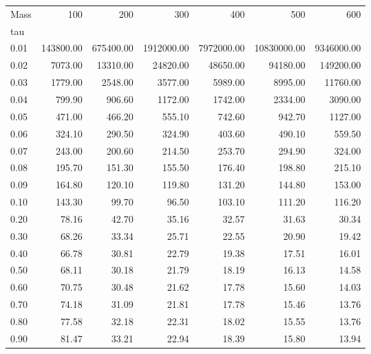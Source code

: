 \begin{tabular}{lrrrrrr}
\toprule
Mass &        100 &        200 &         300 &         400 &          500 &         600 \\
tau   &            &            &             &             &              &             \\
\midrule
0.01  &  143800.00 &  675400.00 &  1912000.00 &  7972000.00 &  10830000.00 &  9346000.00 \\
0.02  &    7073.00 &   13310.00 &    24820.00 &    48650.00 &     94180.00 &   149200.00 \\
0.03  &    1779.00 &    2548.00 &     3577.00 &     5989.00 &      8995.00 &    11760.00 \\
0.04  &     799.90 &     906.60 &     1172.00 &     1742.00 &      2334.00 &     3090.00 \\
0.05  &     471.00 &     466.20 &      555.10 &      742.60 &       942.70 &     1127.00 \\
0.06  &     324.10 &     290.50 &      324.90 &      403.60 &       490.10 &      559.50 \\
0.07  &     243.00 &     200.60 &      214.50 &      253.70 &       294.90 &      324.00 \\
0.08  &     195.70 &     151.30 &      155.50 &      176.40 &       198.80 &      215.10 \\
0.09  &     164.80 &     120.10 &      119.80 &      131.20 &       144.80 &      153.00 \\
0.10  &     143.30 &      99.70 &       96.50 &      103.10 &       111.20 &      116.20 \\
0.20  &      78.16 &      42.70 &       35.16 &       32.57 &        31.63 &       30.34 \\
0.30  &      68.26 &      33.34 &       25.71 &       22.55 &        20.90 &       19.42 \\
0.40  &      66.78 &      30.81 &       22.79 &       19.38 &        17.51 &       16.01 \\
0.50  &      68.11 &      30.18 &       21.79 &       18.19 &        16.13 &       14.58 \\
0.60  &      70.75 &      30.48 &       21.62 &       17.78 &        15.60 &       14.03 \\
0.70  &      74.18 &      31.09 &       21.81 &       17.78 &        15.46 &       13.76 \\
0.80  &      77.58 &      32.18 &       22.31 &       18.02 &        15.55 &       13.76 \\
0.90  &      81.47 &      33.21 &       22.94 &       18.39 &        15.80 &       13.94 \\

\end{tabular}
